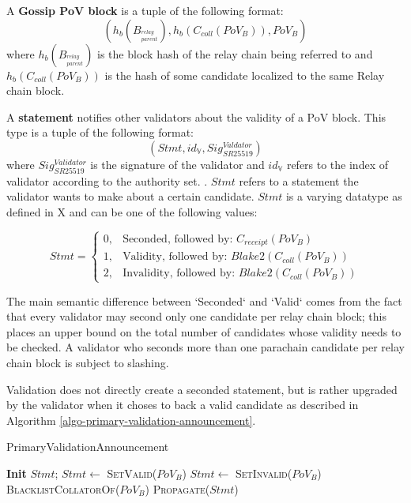 \begin{definition}
  \label{defn-pov-block}
  A \textbf{Gossip PoV block} is a tuple of the following format:
  \[
  (h_b(B_{^{relay}_{parent}}), h_b(C_{coll}(PoV_B)), PoV_B)
  \]
  where $h_b(B_{^{relay}_{parent}})$ is the block hash of the relay chain being
  referred to and $h_b(C_{coll}(PoV_B))$ is the hash of some candidate localized
  to the same Relay chain block.
\end{definition}

\begin{definition}
  \label{defn-gossip-statement}
  A \textbf{statement} notifies other validators about the validity of a PoV block.
  This type is a tuple of the following format:
  \[
  (Stmt, id_{\mathbb{V}}, Sig^{Valdator}_{SR25519})
  \]
  where $Sig^{Validator}_{SR25519}$ is the signature of the validator and
  $id_{\mathbb{V}}$ refers to the index of validator according to the authority
  set. . $Stmt$
  refers to a statement the validator wants to make about a certain candidate.
  $Stmt$ is a varying datatype as defined in X  and can be one
  of the following values:

  \begin{equation*}
    Stmt =
    \begin{cases}
      0, & \text{Seconded, followed by: } C_{receipt}(PoV_B) \\
      1, & \text{Validity, followed by: } Blake2(C_{coll}(PoV_B)) \\
      2, & \text{Invalidity, followed by: } Blake2(C_{coll}(PoV_B))
    \end{cases}
  \end{equation*}

  The main semantic difference between `Seconded` and `Valid` comes from the fact
  that every validator may second only one candidate per relay chain block; this
  places an upper bound on the total number of candidates whose validity needs to
  be checked. A validator who seconds more than one parachain candidate per relay
  chain block is subject to slashing.
  \newline

  Validation does not directly create a seconded statement, but is rather upgraded
  by the validator when it choses to back a valid candidate as described in
  Algorithm \ref{algo-primary-validation-announcement}.
\end{definition}

\begin{algorithm}[H]
  \caption[PrimaryValidationAnnouncement]{\sc PrimaryValidationAnnouncement}
  \label{algo-primary-validation-announcement}
  \begin{algorithmic}[1]
      \State \textbf{Init} $Stmt$;
        \State $Stmt \leftarrow$ \textsc{SetValid($PoV_B$)}
      \Else
        \State $Stmt \leftarrow$ \textsc{SetInvalid($PoV_B$)}
        \State \textsc{BlacklistCollatorOf}($PoV_B$)
      \EndIf
      \State \textsc{Propagate}($Stmt$)
  \end{algorithmic}
\end{algorithm}

